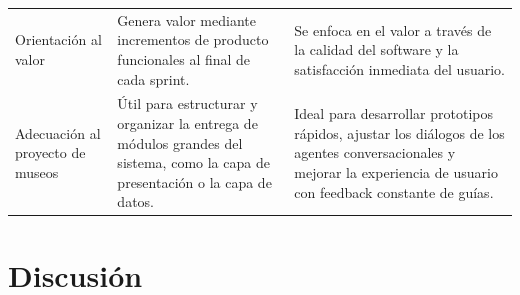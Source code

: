 \documentclass[pdflatex,sn-mathphys-num]{sn-jnl}%
\theoremstyle{thmstyleone}%
\theoremstyle{thmstyletwo}%
\theoremstyle{thmstylethree}%
\begin{document}
\begin{table}[h!]
\begin{tabularx}{\linewidth}{@{} lXX @{}}
Orientación al valor & Genera valor mediante incrementos de producto funcionales al final de cada sprint. & Se enfoca en el valor a través de la calidad del software y la satisfacción inmediata del usuario. \\ \addlinespace

Adecuación al proyecto de museos & Útil para estructurar y organizar la entrega de módulos grandes del sistema, como la capa de presentación o la capa de datos. & Ideal para desarrollar prototipos rápidos, ajustar los diálogos de los agentes conversacionales y mejorar la experiencia de usuario con feedback constante de guías. \\

\bottomrule
\end{tabularx}
\end{table}
\FloatBarrier
\section{Discusión}\label{sec12}
\end{document}
